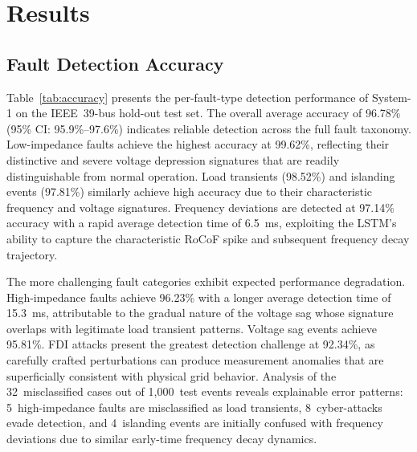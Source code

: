 \documentclass[journal]{IEEEtran}
\begin{document}
\section{Results}
\label{sec:results}

\subsection{Fault Detection Accuracy}

Table~\ref{tab:accuracy} presents the per-fault-type detection performance of System-1 on the IEEE~39-bus hold-out test set. The overall average accuracy of 96.78\% (95\% CI: 95.9\%--97.6\%) indicates reliable detection across the full fault taxonomy. Low-impedance faults achieve the highest accuracy at 99.62\%, reflecting their distinctive and severe voltage depression signatures that are readily distinguishable from normal operation. Load transients (98.52\%) and islanding events (97.81\%) similarly achieve high accuracy due to their characteristic frequency and voltage signatures. Frequency deviations are detected at 97.14\% accuracy with a rapid average detection time of 6.5~ms, exploiting the LSTM's ability to capture the characteristic RoCoF spike and subsequent frequency decay trajectory.

The more challenging fault categories exhibit expected performance degradation. High-impedance faults achieve 96.23\% with a longer average detection time of 15.3~ms, attributable to the gradual nature of the voltage sag whose signature overlaps with legitimate load transient patterns. Voltage sag events achieve 95.81\%. FDI attacks present the greatest detection challenge at 92.34\%, as carefully crafted perturbations can produce measurement anomalies that are superficially consistent with physical grid behavior. Analysis of the 32~misclassified cases out of 1,000~test events reveals explainable error patterns: 5~high-impedance faults are misclassified as load transients, 8~cyber-attacks evade detection, and 4~islanding events are initially confused with frequency deviations due to similar early-time frequency decay dynamics.
\end{document}
